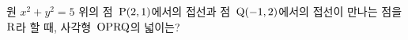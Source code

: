 원 $x^2+y^2=5$ 위의 점~$\mathrm{P}(2{,}\mkern3mu\mathopen{}1)$에서의 접선과 점~$\mathrm{Q}(-1{,}\mkern3mu\mathopen{}2)$에서의 접선이 만나는 점을 $\mathrm{R}$라 할 때, 사각형~$\mathrm{OPRQ}$의 넓이는? 
